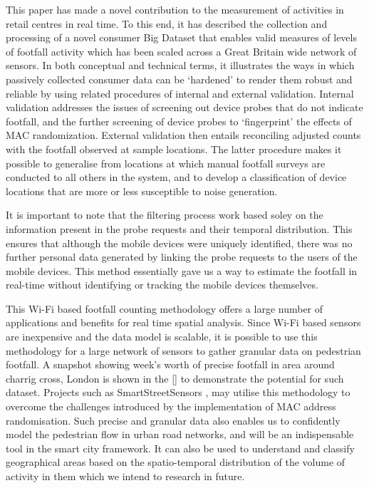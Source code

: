 This paper has made a novel contribution to the measurement of activities in retail centres in real time.
To this end, it has described the collection and processing of a novel consumer Big Dataset that enables valid measures of levels of footfall activity which has been scaled across a Great Britain wide network of sensors.
In both conceptual and technical terms, it illustrates the ways in which passively collected consumer data can be ‘hardened’ to render them robust and reliable by using related procedures of internal and external validation.
Internal validation addresses the issues of screening out device probes that do not indicate footfall, and the further screening of device probes to ‘fingerprint’ the effects of MAC randomization.
External validation then entails reconciling adjusted counts with the footfall observed at sample locations.
The latter procedure makes it possible to generalise from locations at which manual footfall surveys are conducted to all others in the system, and to develop a classification of device locations that are more or less susceptible to noise generation.

It is important to note that the filtering process work based soley on the information present in the probe requests and their temporal distribution.
This ensures that although the mobile devices were uniquely identified, there was no further personal data generated by linking the probe requests to the users of the mobile devices.
This method essentially gave us a way to estimate the footfall in real-time without identifying or tracking the mobile devices themselves. 

This Wi-Fi based footfall counting methodology offers a large number of applications and benefits for real time spatial analysis.
Since Wi-Fi based sensors are inexpensive and the data model is scalable, it is possible to use this methodology for a large network of sensors to gather granular data on pedestrian footfall.
A snapshot showing week's worth of precise footfall in area around charrig cross, London is shown in the \ref{} to demonstrate the potential for such dataset.
Projects such as SmartStreetSensors \citep{sss2016}, may utilise this methodology to overcome the challenges introduced by the implementation of MAC address randomisation.
Such precise and granular data also enables us to confidently model the pedestrian flow in urban road networks, and will be an indispensable tool in the smart city framework.
It can also be used to understand and classify geographical areas based on the spatio-temporal distribution of the volume of activity in them which we intend to research in future.
